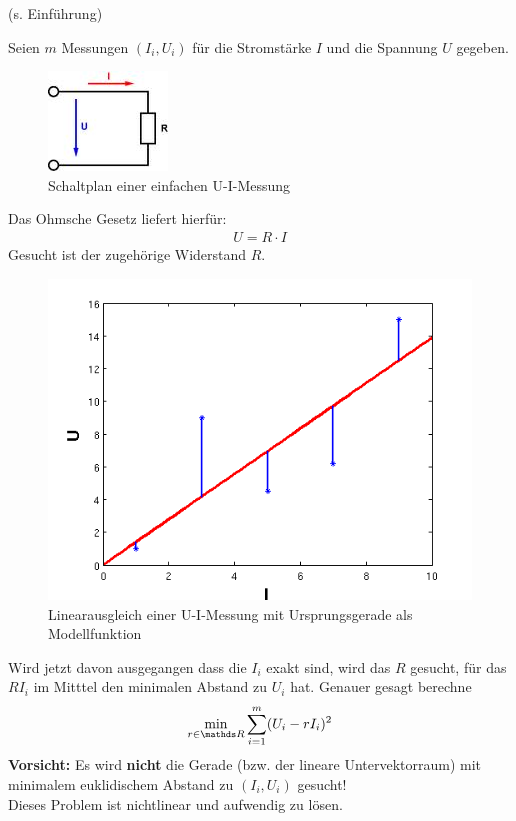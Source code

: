 \begin{Bspe}
	(s. Einführung)
	
	Seien $m$ Messungen $(I_i, U_i)$ für die Stromstärke $I$ und die Spannung $U$ gegeben. \\
	
	\begin{figure}
		\parbox{\linewidth}{
			\centering
			\includegraphics{images/ohmsche.jpeg}
		}
		\caption{Schaltplan einer einfachen U-I-Messung}
	\end{figure}
	
	Das Ohmsche Gesetz liefert hierfür:
	\begin{gather*}
	U=R\cdot I
	\end{gather*}
	Gesucht ist der zugehörige Widerstand $R$.\\
	
	\begin{figure}
		\parbox{\linewidth}{
			\centering
			\includegraphics[width=0.5\linewidth]{images/linausgl2.png}
		}
		\caption{Linearausgleich einer U-I-Messung mit Ursprungsgerade als Modellfunktion}
	\end{figure}
	
	Wird jetzt davon ausgegangen dass die $I_i$ exakt sind, wird das $R$ gesucht, 
	für das $RI_i$ im Mitttel den minimalen Abstand zu $U_i$ hat.
	Genauer gesagt berechne
	\begin{gather*}
	\min_{r\in\R} \sum_{i=1}^{m}(U_i-rI_i)^2
	\end{gather*}
	\textbf{Vorsicht: } Es wird \textbf{nicht} die Gerade (bzw. der lineare Untervektorraum) mit 
	minimalem euklidischem Abstand zu $(I_i,U_i)$ gesucht! \\
	Dieses Problem ist nichtlinear und aufwendig zu lösen.
\end{Bspe}


